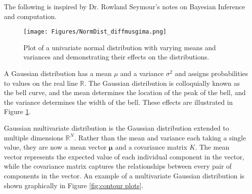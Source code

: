 \documentclass[12pt,a4paper]{article}
\begin{document}
The following is inspired by Dr. Rowland Seymour's notes on Bayesian Inference and computation. \citep{seymour2023BayesianInference}

\begin{figure}[h]
\centering
\texttt{[image: Figures/NormDist\_diffmusgima.png]} 
\caption{Plot of a univariate normal distribution with varying means and variances and demonstrating their effects on the distributions.} \label{fig:NormDist_diffmusigma}
\end{figure}

A Gaussian distribution has a mean \(\mu\) and a variance \(\sigma^2\) and assigns probabilities to values on the real line \(\mathbb{R}\). The Gaussian distribution is colloquially known as the bell curve, and the mean determines the location of the peak of the bell, and the variance determines the width of the bell. These effects are illustrated in Figure \ref{fig:NormDist_diffmusigma}.

Gaussian multivariate distribution is the Gaussian distribution extended to multiple dimensions \(\mathbb{R}^N\). Rather than the mean and variance each taking a single value, they are now a mean vector \(\boldsymbol{\mu}\) and a covariance matrix \(K\). The mean vector represents the expected value of each individual component in the vector, while the covariance matrix captures the relationships between every pair of components in the vector. An example of a multivariate Gaussian distribution is shown graphically in Figure \ref{fig:contour plots}.
\end{document}
